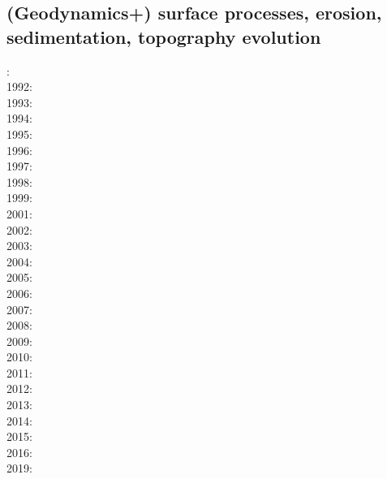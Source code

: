 \subsection{(Geodynamics+) surface processes, erosion, sedimentation, topography evolution}

{\scriptsize
{}: \cite{cull60}\\
1992: \cite{befh92}\\
1993: \cite{povp93}\cite{wibf93}\\
1994: \cite{howa94}\cite{koon94}\cite{kobe94}\cite{gikb94}\\
1995: \cite{chmm95}\cite{koon95}\\
1996: \cite{avbu96}\cite{bekh96}\cite{kobe96}\\
1997: \cite{brsa97}\cite{gaft97}\cite{babr97}\\
1998: \cite{deea98}\cite{vabr98}\\
1999: \cite{will99a}\cite{bupi99}\cite{babr99}\cite{tobr99}\\
2001: \cite{zemk01}\cite{tulg01}\cite{brsh01}\cite{bupo01}\cite{coul01}\cite{crda01}\\
2002: \cite{wibr02}\cite{mobr02}\cite{garc02}\cite{whtu02}\\
2003: \cite{brau03}\\
2004: \cite{fijj04}\cite{gocl04}\cite{simp04}\cite{skdi04}\\
2005: \cite{lave05}\cite{will05}\\
2006: \cite{rosw06}\cite{brau06gsl}\cite{bocr06}\cite{simp06}\cite{stwr06}\\
2007: \cite{buto07}\cite{sebp07}\cite{tomk07}\cite{strw07}\\
2008: \cite{alle08}\cite{rowf08}\\
2009: \cite{whip09}\cite{kuhe09}\cite{makh09}\cite{pina09}\cite{dala09}\\
2010: \cite{will10}\cite{tuha10}\cite{brau10b}\cite{brau10}\cite{brya10}\cite{cmwt10}\\
2011: \cite{robr11}\cite{grhd11}\\
2012: \cite{kiwh12}\\
2013: \cite{vehc13}\cite{brwi13}\cite{fihv13a}\cite{fihv13b}\cite{brrs13}\cite{chgz13}\cite{tuva13}
      \cite{caya13} \\
2014: \cite{crbr14}\cite{cokm14}\cite{erhv14}\cite{erhv15} \\
2015: \cite{uewg15}\\
2016: \cite{coyc16}\\
2019: \cite{anpa19}\cite{sall19}
}

